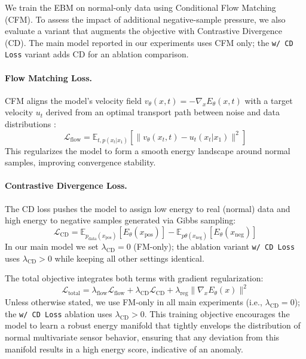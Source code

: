 \documentclass{article}
\begin{document}
We train the EBM on normal-only data using Conditional Flow Matching (CFM). To assess the impact of additional negative-sample pressure, we also evaluate a variant that augments the objective with Contrastive Divergence (CD). The main model reported in our experiments uses CFM only; the \texttt{w/ CD Loss} variant adds CD for an ablation comparison.

\paragraph{Flow Matching Loss.}

CFM aligns the model’s velocity field $v_\theta(x, t) = -\nabla_x E_\theta(x, t)$
with a target velocity $u_t$ derived from an optimal transport path between noise and data distributions \citep{lipman_2023}:
\[ \mathcal{L}_{\text{flow}} =
\mathbb{E}_{t, p(x_t|x_1)} \left[
\| v_\theta(x_t, t) - u_t(x_t|x_1) \|^2
\right] 
\]
This regularizes the model to form a smooth energy landscape around normal samples, improving convergence stability.

\paragraph{Contrastive Divergence Loss.}\label{sec:cd_loss}

The CD loss pushes the model to assign low energy to real (normal) data and high energy to negative samples generated via Gibbs sampling:
\[ \mathcal{L}_{\text{CD}} =
\mathbb{E}_{p_{\text{data}}(x_{\text{pos}})} [E_\theta(x_{\text{pos}})] -
\mathbb{E}_{p\theta(x_{\text{neg}})} [E_\theta(x_{\text{neg}})] \]
In our main model we set $\lambda_{\text{CD}} = 0$ (FM-only); the ablation variant \texttt{w/ CD Loss} uses $\lambda_{\text{CD}} > 0$ while keeping all other settings identical.

The total objective integrates both terms with gradient regularization:
\[ \mathcal{L}_{\text{total}} =
\lambda_{\text{flow}} \mathcal{L}_{\text{flow}} +
\lambda_{\text{CD}} \mathcal{L}_{\text{CD}} +
\lambda_{\text{reg}} \| \nabla_x E_\theta(x) \|^2 \]
Unless otherwise stated, we use FM-only in all main experiments (i.e., $\lambda_{\text{CD}} = 0$); the \texttt{w/ CD Loss} ablation uses $\lambda_{\text{CD}} > 0$.
This training objective encourages the model to learn a robust energy manifold that tightly envelops the distribution of normal multivariate sensor behavior, ensuring that any deviation from this manifold results in a high energy score, indicative of an anomaly.
\end{document}
